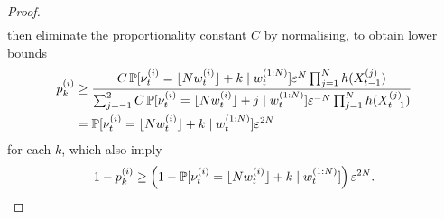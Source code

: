 \begin{proof}
\begin{align*}
\end{align*}
then eliminate the proportionality constant $C$ by normalising, to obtain lower bounds
\begin{align}
p_k^{(i)} 
&\geq \frac{ C \, \mathbb{P} [ \nu_t^{(i)} = \lfloor N w_t^{(i)} \rfloor + k \mid w_t^{(1:N)} ] 
        \varepsilon^N \prod_{j=1}^N h(X_{t-1}^{(j)}) }{
        \sum_{j=-1}^2 C \, \mathbb{P} [ \nu_t^{(i)} = \lfloor N w_t^{(i)} \rfloor + j \mid w_t^{(1:N)} ] 
        \varepsilon^{-N} \prod_{j=1}^N h(X_{t-1}^{(j)}) } \notag\\
&= \mathbb{P} [ \nu_t^{(i)} = \lfloor N w_t^{(i)} \rfloor + k \mid w_t^{(1:N)} ] \varepsilon^{2N} 
        \label{eq:strat_pbounds}
\end{align}
for each $k$, which also imply
\begin{equation}
1 - p_k^{(i)} 
\geq \left( 1- \mathbb{P} [ \nu_t^{(i)} = \lfloor N w_t^{(i)} \rfloor + k \mid w_t^{(1:N)} ] \right)
        \varepsilon^{2N} . \label{eq:strat_nonpbounds}
\end{equation}


\end{proof}

